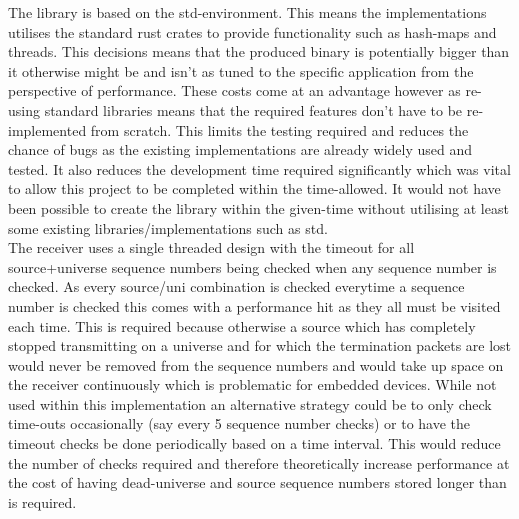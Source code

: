 \documentclass[11pt,a4paper]{report}
\begin{document}
The library is based on the std-environment. This means the implementations utilises the standard rust crates to provide functionality such as hash-maps and threads. This decisions means that the produced binary is potentially bigger than it otherwise might be and isn't as tuned to the specific application from the perspective of performance. These costs come at an advantage however as re-using standard libraries means that the required features don't have to be re-implemented from scratch. This limits the testing required and reduces the chance of bugs as the existing implementations are already widely used and tested. It also reduces the development time required significantly which was vital to allow this project to be completed within the time-allowed. It would not have been possible to create the library within the given-time without utilising at least some existing libraries/implementations such as std.\\

The receiver uses a single threaded design with the timeout for all source+universe sequence numbers being checked when any sequence number is checked. As every source/uni combination is checked everytime a sequence number is checked this comes with a performance hit as they all must be visited each time. This is required because otherwise a source which has completely stopped transmitting on a universe and for which the termination packets are lost would never be removed from the sequence numbers and would take up space on the receiver continuously which is problematic for embedded devices. While not used within this implementation an alternative strategy could be to only check time-outs occasionally (say every 5 sequence number checks) or to have the timeout checks be done periodically based on a time interval. This would reduce the number of checks required and therefore theoretically increase performance at the cost of having dead-universe and source sequence numbers stored longer than is required.\\
\end{document}
